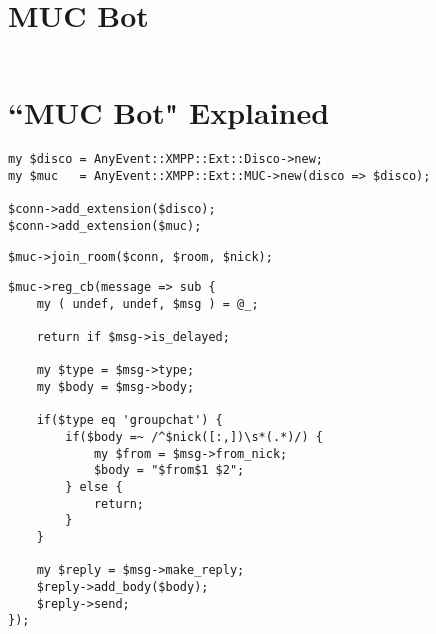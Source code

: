 \section{MUC Bot}

\pause

\begin{shaded}
\inputminted{perl}{examples/muc-bot.pl}
\end{shaded}

\newpage

\section{``MUC Bot" Explained}

\pause

\begin{shaded}
\begin{verbatim}
my $disco = AnyEvent::XMPP::Ext::Disco->new;
my $muc   = AnyEvent::XMPP::Ext::MUC->new(disco => $disco);

$conn->add_extension($disco);
$conn->add_extension($muc);
\end{verbatim}
\end{shaded}

\pause

\begin{shaded}
\begin{verbatim}
$muc->join_room($conn, $room, $nick);
\end{verbatim}
\end{shaded}

\newpage

\begin{shaded}
\begin{verbatim}
$muc->reg_cb(message => sub {
    my ( undef, undef, $msg ) = @_;

    return if $msg->is_delayed;

    my $type = $msg->type;
    my $body = $msg->body;

    if($type eq 'groupchat') {
        if($body =~ /^$nick([:,])\s*(.*)/) {
            my $from = $msg->from_nick;
            $body = "$from$1 $2";
        } else {
            return;
        }
    }

    my $reply = $msg->make_reply;
    $reply->add_body($body);
    $reply->send;
});
\end{verbatim}
\end{shaded}
